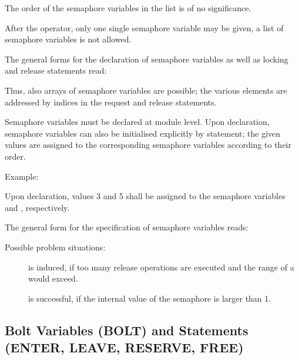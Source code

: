 The order of the semaphore variables in the list is of no significance.

After the  operator, only one single semaphore variable may be
given, a list of semaphore variables is not allowed.

The general forms for the declaration of semaphore variables as well as
locking and release statements read:

\begin{grammarframe}
\end{grammarframe}


Thus, also arrays of semaphore variables are possible; the various
elements are addressed by indices in the request and release
statements.

Semaphore variables must be declared at module level. Upon declaration,
semaphore variables can also be initialised explicitly by 
statement; the given values are assigned to the corresponding
semaphore variables according to their order.

Example:

Upon declaration, values 3 and 5 shall be assigned to the semaphore
variables  and , respectively.


The general form for the specification of semaphore variables reads:

\begin{grammarframe}
\end{grammarframe}

Possible problem situations:

\begin{description}
\item[] is induced, if too many release operations
   are executed and the range of a  would exceed.
\item[ ] is successful, if the internal value of the 
   semaphore is larger than 1.

\end{description}

\subsection{Bolt Variables (BOLT) and Statements (ENTER, LEAVE,
RESERVE, FREE)} %
\label{sec_bolt}

